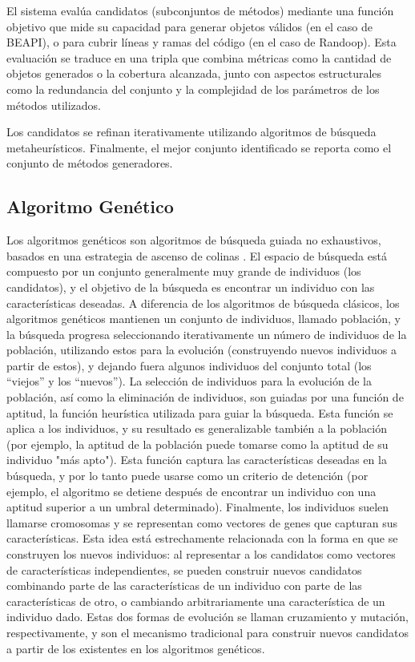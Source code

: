 El sistema evalúa candidatos (subconjuntos de métodos) mediante una función objetivo que mide su capacidad para generar objetos válidos (en el caso de BEAPI), o para cubrir líneas y ramas del código (en el caso de Randoop).
Esta evaluación se traduce en una tripla que combina métricas como la cantidad de objetos generados o la cobertura alcanzada, junto con aspectos estructurales como la redundancia del conjunto y la complejidad de los parámetros de los métodos utilizados.

Los candidatos se refinan iterativamente utilizando algoritmos de búsqueda metaheurísticos. 
Finalmente, el mejor conjunto identificado se reporta como el conjunto de métodos generadores.


\subsection{Algoritmo Genético}
\label{alg:approachGA}

Los algoritmos genéticos \cite{Goldberg:1989} son algoritmos de búsqueda guiada no exhaustivos, 
basados en una estrategia de ascenso de colinas \cite{Russell:2009}. El espacio de búsqueda está 
compuesto por un conjunto generalmente muy grande de individuos (los candidatos), y
el objetivo de la búsqueda es encontrar un individuo con las características deseadas. 
A diferencia de los algoritmos de búsqueda clásicos, los algoritmos genéticos mantienen un conjunto de individuos,
llamado población, y la búsqueda progresa seleccionando iterativamente un número de individuos de la población, 
utilizando estos para la evolución (construyendo nuevos individuos a partir de estos), 
y dejando fuera algunos individuos del conjunto total (los ``viejos'' y los ``nuevos'').
La selección de individuos para la evolución de la población, así como la eliminación de individuos, 
son guiadas por una función de aptitud, la función heurística utilizada para guiar la búsqueda. 
Esta función se aplica a los individuos, y su resultado es generalizable también a la población 
(por ejemplo, la aptitud de la población puede tomarse como la aptitud de su individuo "más apto").
Esta función captura las características deseadas en la búsqueda, y por lo tanto puede usarse como un 
criterio de detención (por ejemplo, el algoritmo se detiene después de encontrar un individuo con una 
aptitud superior a un umbral determinado). Finalmente, los individuos suelen llamarse cromosomas y 
se representan como vectores de genes que capturan sus características. Esta idea está estrechamente relacionada 
con la forma en que se construyen los nuevos individuos: al representar a los candidatos como vectores de 
características independientes, se pueden construir nuevos candidatos combinando parte de las características 
de un individuo con parte de las características de otro, o cambiando arbitrariamente una característica de 
un individuo dado. Estas dos formas de evolución se llaman cruzamiento y mutación, respectivamente, y son el 
mecanismo tradicional para construir nuevos candidatos a partir de los existentes en los algoritmos genéticos. 

